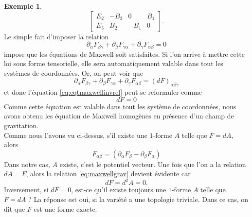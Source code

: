 \documentclass[a4paper,11pt]{report}
\theoremstyle{definition}
\theoremstyle{plain}
\theoremstyle{definition}
\newtheorem{exmp}{Exemple}[chapter]
\theoremstyle{remark}
\newcommand{\p}{\partial}
\begin{document}
\begin{exmp}
\begin{equation}
\begin{bmatrix}
                    E_2 & -B_3 & 0 & B_1 \\
                    E_3 & B_2 & -B_1 & 0
                    \end{bmatrix}.
                \end{equation}
                Le simple fait d'imposer la relation
                \begin{equation}\label{eq:eqtmaxwellinvrel}
                    \p_\alpha F_{\beta\gamma}+\p_\beta F_{\gamma\alpha}+\p_\gamma F_{\alpha\beta} = 0
                \end{equation}
                impose que les équations de Maxwell soit satisfaites. Si l'on arrive à mettre cette loi sous forme tensorielle, elle sera automatiquement valable dans tout les systèmes de coordonnées. Or, on peut voir que
                \begin{equation}
                    \p_\alpha F_{\beta\gamma}+\p_\beta F_{\gamma\alpha}+\p_\gamma F_{\alpha\beta} = (dF)_{\alpha\beta\gamma}
                \end{equation}
                et donc l'équation \ref{eq:eqtmaxwellinvrel} peut se reformuler comme
                \begin{equation}\label{eq:maxwellgrav}
                    dF = 0
                \end{equation}
                Comme cette équation est valable dans tout les système de coordonnées, nous avons obtenu les équation de Maxwell homogènes en présence d'un champ de gravitation.\\
                
                Comme nous l'avons vu ci-dessus, s'il existe une $1$-forme $A$ telle que $F = dA$, alors
                \begin{equation}
                    F_{\alpha\beta} = (\p_\alpha F_\beta-\p_\beta F_\alpha)
                \end{equation}
                Dans notre cas, $A$ existe, c'est le potentiel vecteur. Une fois que l'on a la relation $dA = F$, alors la relation \ref{eq:maxwellgrav} devient évidente car
                \begin{equation}
                    dF = d^2A = 0.
                \end{equation}
                Inversement, si $dF = 0$, est-ce qu'il existe toujours une $1$-forme $A$ telle que $F = dA$ ? La réponse est oui, si la variété a une topologie triviale. Dans ce cas, on dit que $F$ est une forme exacte.
            \end{exmp}
            
\end{document}
